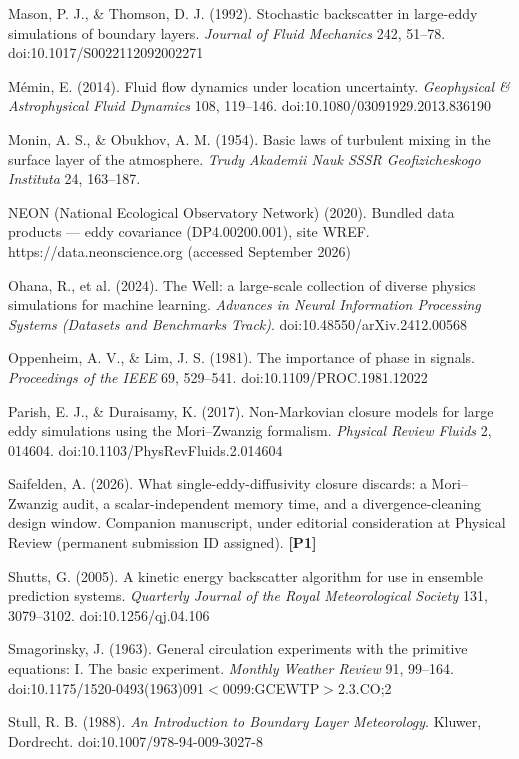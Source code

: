 \documentclass[11pt]{article}
\begin{document}
Mason, P. J., \& Thomson, D. J. (1992). Stochastic backscatter in large-eddy simulations of boundary layers. \emph{Journal of Fluid Mechanics} 242, 51--78. doi:10.1017/S0022112092002271

M\'emin, E. (2014). Fluid flow dynamics under location uncertainty. \emph{Geophysical \& Astrophysical Fluid Dynamics} 108, 119--146. doi:10.1080/03091929.2013.836190

Monin, A. S., \& Obukhov, A. M. (1954). Basic laws of turbulent mixing in the surface layer of the atmosphere. \emph{Trudy Akademii Nauk SSSR Geofizicheskogo Instituta} 24, 163--187.

NEON (National Ecological Observatory Network) (2020). Bundled data products --- eddy covariance (DP4.00200.001), site WREF. https://data.neonscience.org (accessed September 2026)

Ohana, R., et al. (2024). The Well: a large-scale collection of diverse physics simulations for machine learning. \emph{Advances in Neural Information Processing Systems (Datasets and Benchmarks Track)}. doi:10.48550/arXiv.2412.00568

Oppenheim, A. V., \& Lim, J. S. (1981). The importance of phase in signals. \emph{Proceedings of the IEEE} 69, 529--541. doi:10.1109/PROC.1981.12022

Parish, E. J., \& Duraisamy, K. (2017). Non-Markovian closure models for large eddy simulations using the Mori--Zwanzig formalism. \emph{Physical Review Fluids} 2, 014604. doi:10.1103/\hspace{0pt}PhysRevFluids.2.014604

Saifelden, A. (2026). What single-eddy-diffusivity closure discards: a Mori--Zwanzig audit, a scalar-independent memory time, and a divergence-cleaning design window. Companion manuscript, under editorial consideration at Physical Review (permanent submission ID assigned). \textbf{[P1]}

Shutts, G. (2005). A kinetic energy backscatter algorithm for use in ensemble prediction systems. \emph{Quarterly Journal of the Royal Meteorological Society} 131, 3079--3102. doi:10.1256/qj.04.106

Smagorinsky, J. (1963). General circulation experiments with the primitive equations: I. The basic experiment. \emph{Monthly Weather Review} 91, 99--164. doi:10.1175/\hspace{0pt}1520-0493(1963)091$<$0099:GCEWTP$>$2.3.CO;2

Stull, R. B. (1988). \emph{An Introduction to Boundary Layer Meteorology}. Kluwer, Dordrecht. doi:10.1007/\hspace{0pt}978-94-009-3027-8
\endgroup
\end{document}

